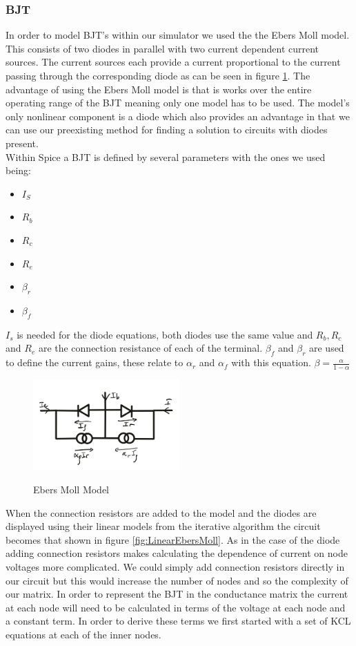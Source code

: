 \documentclass{article}
\begin{document}
\subsubsection{BJT}
In order to model BJT's within our simulator we used the the Ebers Moll model. This consists of two diodes in parallel with two current dependent current sources. The current sources each provide a current proportional to the current passing through the corresponding diode as can be seen in figure \ref{fig:EbersMoll}. The advantage of using the Ebers Moll model is that is works over the entire operating range of the BJT meaning only one model has to be used. The model's only nonlinear component is a diode which also provides an advantage in that we can use our preexisting method for finding a solution to circuits with diodes present. \\
Within Spice a BJT is defined by several parameters with the ones we used being: 
\begin{itemize}
    \item $I_S$
    \item $R_b$
    \item $R_c$
    \item $R_e$
    \item $\beta_r$
    \item $\beta_f$
\end{itemize}
$I_s$ is needed for the diode equations, both diodes use the same value and $R_b, R_c$ and $R_e$ are the connection resistance of each of the terminal. $\beta_f$ and $\beta_r$ are used to define the current gains, these relate to $\alpha_r$ and $\alpha_f$ with this equation. \bigbreak
$\beta = \frac{\alpha}{1-\alpha}$\bigbreak
\begin{figure}[h]
    \caption{Ebers Moll Model}
    \centering
    \includegraphics[width=0.5\textwidth]{images/EbersMoll.png}
    \label{fig:EbersMoll}
\end{figure}
When the connection resistors are added to the model and the diodes are displayed using their linear models from the iterative algorithm the circuit becomes that shown in figure \ref{fig:LinearEbersMoll}. As in the case of the diode adding connection resistors makes calculating the dependence of current on node voltages more complicated. We could simply add connection resistors directly in our circuit but this would increase the number of nodes and so the complexity of our matrix. In order to represent the BJT in the conductance matrix the current at each node will need to be calculated in terms of the voltage at each node and a constant term. In order to derive these terms we first started with a set of KCL equations at each of the inner nodes. \bigbreak
\end{document}
